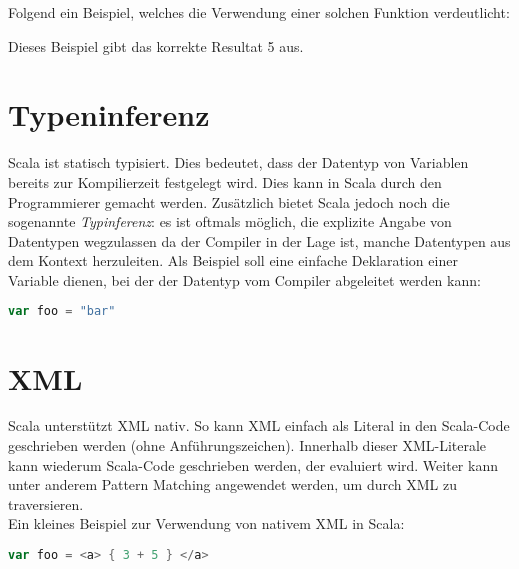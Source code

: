 Folgend ein Beispiel, welches die Verwendung einer solchen Funktion
verdeutlicht: 



Dieses Beispiel gibt das korrekte Resultat 5 aus.


\section{Typeninferenz}

Scala ist statisch typisiert. Dies bedeutet, dass der Datentyp von
Variablen bereits zur Kompilierzeit festgelegt wird. Dies kann in Scala
durch den Programmierer gemacht werden. Zusätzlich bietet Scala jedoch
noch die sogenannte \emph{Typinferenz}: es ist oftmals möglich, die
explizite Angabe von Datentypen wegzulassen da der Compiler in der Lage
ist, manche Datentypen aus dem Kontext herzuleiten. Als Beispiel
soll eine einfache Deklaration einer Variable dienen, bei der der Datentyp
vom Compiler abgeleitet werden kann:

\begin{lstlisting}[float=ht,language=scala,caption=Automatisch hergeleiteter Datentyp,label=lst:typeinference]
var foo = "bar"
\end{lstlisting}


\section{XML}

Scala unterstützt XML nativ. So kann XML einfach als Literal in den
Scala-Code geschrieben werden (ohne Anführungszeichen). Innerhalb
dieser XML-Literale kann wiederum Scala-Code geschrieben werden, der
evaluiert wird.  Weiter kann unter anderem Pattern Matching angewendet
werden, um durch XML zu traversieren. \\

Ein kleines Beispiel zur Verwendung von nativem XML in Scala:
\begin{lstlisting}[float=ht,language=scala,caption={XML mit Code, der evaluiert wird},label=lst:xml]
var foo = <a> { 3 + 5 } </a>
\end{lstlisting}


